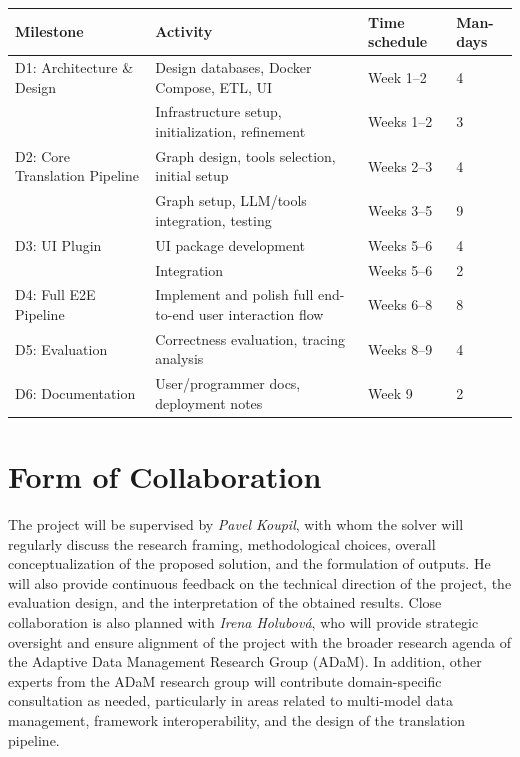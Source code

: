 \documentclass{article}
\begin{document}
\begin{table}[H]
\centering
\begin{tabular}{ | m{10em} | m{23em} | m{3.5cm} | m{1.3cm} | }
\hline
Milestone & Activity & Time schedule & Man-days \\
\hline
D1: Architecture \& Design & Design databases, Docker Compose, ETL, UI & Week 1--2 & 4 \\
              & Infrastructure setup, initialization, refinement & Weeks 1--2 & 3 \\
\hline
D2: Core Translation Pipeline & Graph design, tools selection, initial setup & Weeks 2--3 & 4 \\
              & Graph setup, LLM/tools integration, testing & Weeks 3--5 & 9 \\
\hline
D3: UI Plugin & UI package development & Weeks 5--6 & 4 \\
              & Integration & Weeks 5--6 & 2 \\
\hline
D4: Full E2E Pipeline & Implement and polish full end-to-end user interaction flow & Weeks 6--8 & 8 \\
\hline
D5: Evaluation & Correctness evaluation, tracing analysis & Weeks 8--9 & 4 \\
\hline
D6: Documentation & User/programmer docs, deployment notes & Week 9 & 2 \\
\hline
\end{tabular}
\label{tab:time-shedule}
\end{table}

\section{Form of Collaboration}

The project will be supervised by \textit{Pavel Koupil}, with whom the solver will regularly discuss the research framing, methodological choices, overall conceptualization of the proposed solution, and the formulation of outputs. He will also provide continuous feedback on the technical direction of the project, the evaluation design, and the interpretation of the obtained results. Close collaboration is also planned with \textit{Irena Holubová}, who will provide strategic oversight and ensure alignment of the project with the broader research agenda of the Adaptive Data Management Research Group (ADaM). In addition, other experts from the ADaM research group will contribute domain-specific consultation as needed, particularly in areas related to multi-model data management, framework interoperability, and the design of the translation pipeline.
\end{document}
